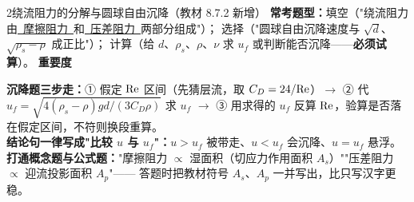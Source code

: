 \begin{kaodian}{2}{绕流阻力的分解与圆球自由沉降（教材 8.7.2 新增）}
\textbf{常考题型：}填空（"绕流阻力由\underline{\ 摩擦阻力\ }和\underline{\ 压差阻力\ }两部分组成"）；
选择（"圆球自由沉降速度与 $\sqrt{d}$、$\sqrt{\rho_s-\rho}$ 成正比"）；
计算（给 $d$、$\rho_s$、$\rho$、$\nu$ 求 $u_f$ 或判断能否沉降——\textbf{必须试算}）。
\textbf{重要度 }\quad{}\quad{}

\begin{banfa}
\textbf{沉降题三步走：}① 假定 $\mathrm{Re}$ 区间（先猜层流，取 $C_D=24/\mathrm{Re}$）$\to$
② 代 $u_f=\sqrt{4(\rho_s-\rho)gd/(3C_D\rho)}$ 求 $u_f$ $\to$ ③ 用求得的 $u_f$ 反算 $\mathrm{Re}$，验算是否落在假定区间，不符则换段重算。\\
\textbf{结论句一律写成"比较 $u$ 与 $u_f$"：}$u>u_f$ 被带走、$u<u_f$ 会沉降、$u=u_f$ 悬浮。
\textbf{打通概念题与公式题：}"摩擦阻力 $\propto$ 湿面积（切应力作用面积 $A_s$）""压差阻力 $\propto$ 迎流投影面积 $A_p$"——
答题时把教材符号 $A_s$、$A_p$ 一并写出，比只写汉字更稳。
\end{banfa}
\end{kaodian}

